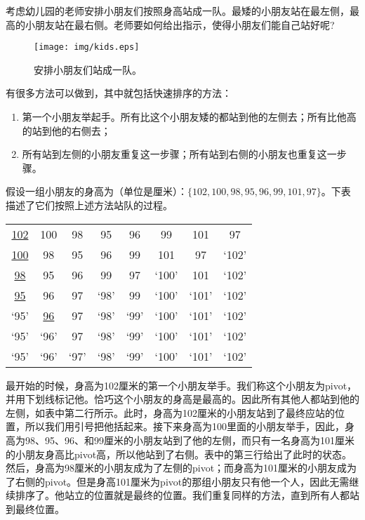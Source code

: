\documentclass[UTF8]{article}
\begin{document}
考虑幼儿园的老师安排小朋友们按照身高站成一队。最矮的小朋友站在最左侧，最高的小朋友站在最右侧。老师要如何给出指示，使得小朋友们能自己站好呢?

\begin{figure}[htbp]
 \centering
 \texttt{[image: img/kids.eps]}
 \caption{安排小朋友们站成一队。}
 \label{fig:knuth-ssort}
\end{figure}

有很多方法可以做到，其中就包括快速排序的方法：

\begin{enumerate}
  \item 第一个小朋友举起手。所有比这个小朋友矮的都站到他的左侧去；所有比他高的站到他的右侧去；
  \item 所有站到左侧的小朋友重复这一步骤；所有站到右侧的小朋友也重复这一步骤。
\end{enumerate}

假设一组小朋友的身高为（单位是厘米）：$\{102, 100, 98, 95, 96, 99, 101, 97\}$。下表描述了它们按照上述方法站队的过程。

\begin{tabular}{ | c c c c c c c c |}
\hline
\underline{102} & 100 & 98 & 95 & 96 & 99 & 101 & 97 \\
\underline{100} & 98 & 95 & 96 & 99 & 101 & 97 & `102' \\
\underline{98} & 95 & 96 & 99 & 97 & `100' & 101 & `102' \\
\underline{95} & 96 & 97 & `98' & 99 & `100' & `101' & `102' \\
`95' & \underline{96} & 97 & `98' & `99' & `100' & `101' & `102' \\
`95' & `96' & 97 & `98' & `99' & `100' & `101' & `102' \\
`95' & `96' & `97' & `98' & `99' & `100' & `101' & `102' \\
\hline
\end{tabular}

最开始的时候，身高为102厘米的第一个小朋友举手。我们称这个小朋友为pivot，并用下划线标记他。恰巧这个小朋友的身高是最高的。因此所有其他人都站到他的左侧，如表中第二行所示。此时，身高为102厘米的小朋友站到了最终应站的位置，所以我们用引号把他括起来。接下来身高为100里面的小朋友举手，因此，身高为98、95、96、和99厘米的小朋友站到了他的左侧，而只有一名身高为101厘米的小朋友身高比pivot高，所以他站到了右侧。表中的第三行给出了此时的状态。然后，身高为98厘米的小朋友成为了左侧的pivot；而身高为101厘米的小朋友成为了右侧的pivot。但是身高101厘米为pivot的那组小朋友只有他一个人，因此无需继续排序了。他站立的位置就是最终的位置。我们重复同样的方法，直到所有人都站到最终位置。
\end{document}

